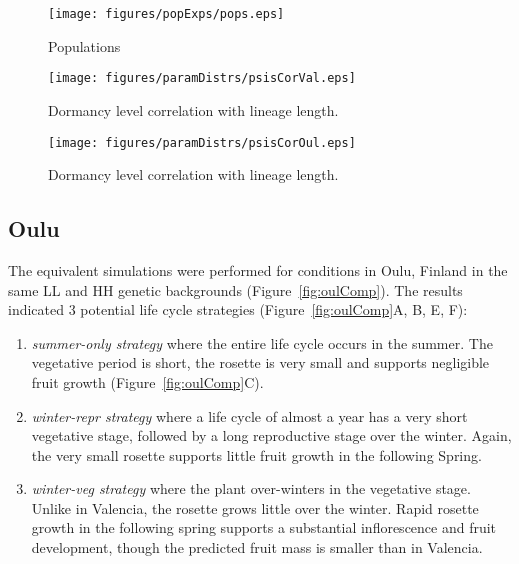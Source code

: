 \begin{figure}
  \centering
  \texttt{[image: figures/popExps/pops.eps]}
  \caption{Populations}
  \label{fig:pops}
\end{figure}

\begin{figure}
  \centering
  \texttt{[image: figures/paramDistrs/psisCorVal.eps]}
  \caption{Dormancy level correlation with lineage length.}
  \label{fig:psisCorVal}
\end{figure}

\begin{figure}
  \centering
  \texttt{[image: figures/paramDistrs/psisCorOul.eps]}
  \caption{Dormancy level correlation with lineage length.}
  \label{fig:psisCorOul}
\end{figure}



\subsection{Oulu}
\label{oulu}
The equivalent simulations were performed for conditions in Oulu,
Finland in the same LL and HH genetic backgrounds (Figure~\ref{fig:oulComp}). The
results indicated 3 potential life cycle strategies (Figure~\ref{fig:oulComp}A, B, E,
F):

\begin{enumerate}
\def\labelenumi{\arabic{enumi}.}
\item
  \emph{summer-only strategy} where the entire life cycle occurs in the
  summer. The vegetative period is short, the rosette is very small and
  supports negligible fruit growth (Figure~\ref{fig:oulComp}C).
\item
  \emph{winter-repr strategy} where a life cycle of almost a year has a
  very short vegetative stage, followed by a long reproductive stage
  over the winter. Again, the very small rosette supports little fruit
  growth in the following Spring.
\item
  \emph{winter-veg strategy} where the plant over-winters in the
  vegetative stage. Unlike in Valencia, the rosette grows little over
  the winter. Rapid rosette growth in the following spring supports a
  substantial inflorescence and fruit development, though the predicted
  fruit mass is smaller than in Valencia.
\end{enumerate}

